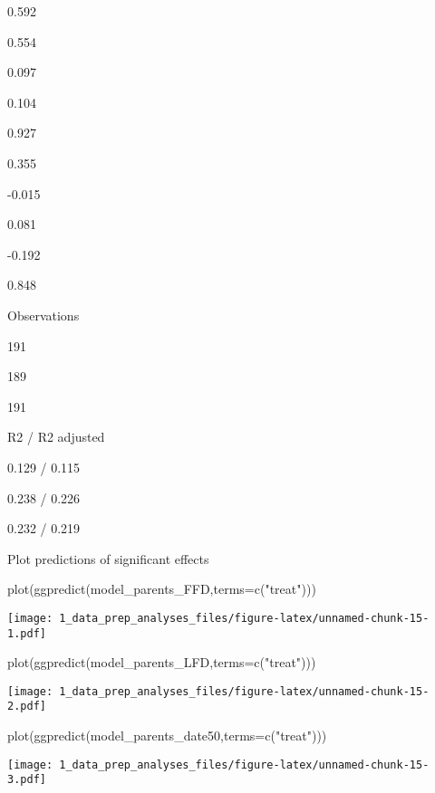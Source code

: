 \documentclass[
]{article}
\newenvironment{Shaded}{\begin{snugshade}}{\end{snugshade}}
\newcommand{\AttributeTok}[1]{\textcolor[rgb]{0.77,0.63,0.00}{#1}}
\newcommand{\FunctionTok}[1]{\textcolor[rgb]{0.00,0.00,0.00}{#1}}
\newcommand{\NormalTok}[1]{#1}
\newcommand{\StringTok}[1]{\textcolor[rgb]{0.31,0.60,0.02}{#1}}
\begin{document}
0.592

0.554

0.097

0.104

0.927

0.355

-0.015

0.081

-0.192

0.848

Observations

191

189

191

R2 / R2 adjusted

0.129 / 0.115

0.238 / 0.226

0.232 / 0.219

Plot predictions of significant effects

\begin{Shaded}
\begin{Highlighting}[]
\FunctionTok{plot}\NormalTok{(}\FunctionTok{ggpredict}\NormalTok{(model\_parents\_FFD,}\AttributeTok{terms=}\FunctionTok{c}\NormalTok{(}\StringTok{"treat"}\NormalTok{)))}
\end{Highlighting}
\end{Shaded}

\texttt{[image: 1\_data\_prep\_analyses\_files/figure-latex/unnamed-chunk-15-1.pdf]}

\begin{Shaded}
\begin{Highlighting}[]
\FunctionTok{plot}\NormalTok{(}\FunctionTok{ggpredict}\NormalTok{(model\_parents\_LFD,}\AttributeTok{terms=}\FunctionTok{c}\NormalTok{(}\StringTok{"treat"}\NormalTok{)))}
\end{Highlighting}
\end{Shaded}

\texttt{[image: 1\_data\_prep\_analyses\_files/figure-latex/unnamed-chunk-15-2.pdf]}

\begin{Shaded}
\begin{Highlighting}[]
\FunctionTok{plot}\NormalTok{(}\FunctionTok{ggpredict}\NormalTok{(model\_parents\_date50,}\AttributeTok{terms=}\FunctionTok{c}\NormalTok{(}\StringTok{"treat"}\NormalTok{)))}
\end{Highlighting}
\end{Shaded}

\texttt{[image: 1\_data\_prep\_analyses\_files/figure-latex/unnamed-chunk-15-3.pdf]}
\end{document}
